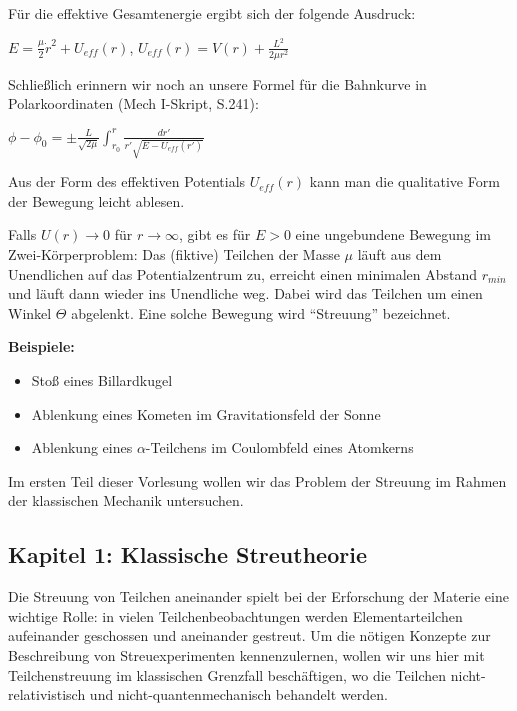 \documentclass[10pt, letterpaper]{article}
\begin{document}
Für die effektive Gesamtenergie ergibt sich der folgende Ausdruck:

$E = \frac{\mu}{2}\dot{r}^2 + U_{eff}(r)$, $U_{eff}(r) = V(r) + \frac{L^2}{2\mu r^2}$

Schließlich erinnern wir noch an unsere Formel für die Bahnkurve in Polarkoordinaten (Mech I-Skript, S.241):

$\phi - \phi_0 = \pm \frac{L}{\sqrt{2\mu}} \int_{r_0}^r \frac{dr'}{r'\sqrt{E-U_{eff}(r')}}$

Aus der Form des effektiven Potentials $U_{eff}(r)$ kann man die qualitative Form der Bewegung leicht ablesen.

\begin{center}
\end{center}
Falls $U(r) \to 0$ für $r \to \infty$, gibt es für $E > 0$ eine ungebundene Bewegung im Zwei-Körperproblem: Das (fiktive) Teilchen der Masse $\mu$ läuft aus dem Unendlichen auf das Potentialzentrum zu, erreicht einen minimalen Abstand $r_{min}$ und läuft dann wieder ins Unendliche weg. Dabei wird das Teilchen um einen Winkel $\Theta$ abgelenkt. Eine solche Bewegung wird ``Streuung'' bezeichnet.

\textbf{Beispiele:}
\begin{itemize}
\item Stoß eines Billardkugel
\item Ablenkung eines Kometen im Gravitationsfeld der Sonne
\item Ablenkung eines $\alpha$-Teilchens im Coulombfeld eines Atomkerns
\end{itemize}

Im ersten Teil dieser Vorlesung wollen wir das Problem der Streuung im Rahmen der klassischen Mechanik untersuchen.
\subsection{Kapitel 1: Klassische Streutheorie}

Die Streuung von Teilchen aneinander spielt bei der Erforschung der Materie eine wichtige Rolle: in vielen Teilchenbeobachtungen werden Elementarteilchen aufeinander geschossen und aneinander gestreut. Um die nötigen Konzepte zur Beschreibung von Streuexperimenten kennenzulernen, wollen wir uns hier mit Teilchenstreuung im klassischen Grenzfall beschäftigen, wo die Teilchen nicht-relativistisch und nicht-quantenmechanisch behandelt werden.
\end{document}
